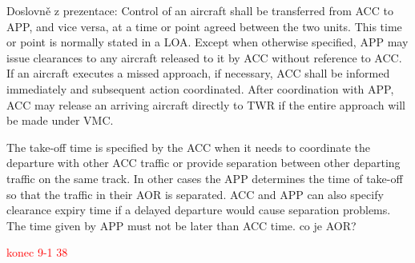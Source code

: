 Doslovně z prezentace:
Control of an aircraft shall be transferred from ACC to APP, and vice versa, at a time or point agreed between the two units. This time or point is normally stated in a LOA.
Except when otherwise specified, APP may issue clearances to any aircraft released to it by ACC without reference to ACC. If an aircraft executes a missed approach, if necessary, ACC shall be informed immediately and subsequent action coordinated. 
After coordination with APP, ACC may release an arriving aircraft directly to TWR if the entire approach will be made under VMC.\cite[Chapter 10.1.3.1]{doc4444}

The take-off time is specified by the ACC when it needs to coordinate the departure with other ACC traffic or provide separation between other departing traffic on the same track. In other cases the APP determines the time of take-off so that the traffic in their AOR is separated. ACC and APP can also specify clearance expiry time if a delayed departure would cause separation problems. The time given by APP must not be later than ACC time. co je AOR?\cite[Chapter 10.1.3.2]{doc4444}

\textcolor{red}{konec 9-1 38}